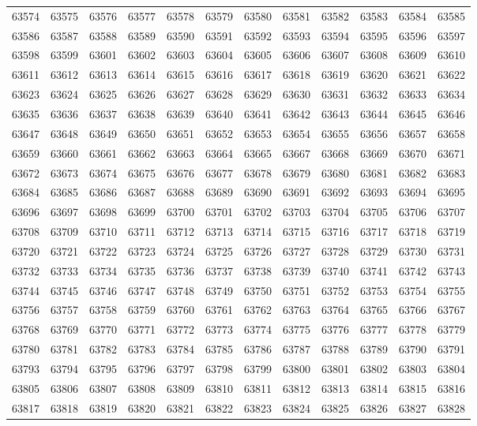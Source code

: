 \begin{center}
\begin{longtable}{llllllllllll}
63574 &63575 &63576 &63577 &63578 &63579 &63580 &63581 &63582 &63583 &63584 &63585 \\
63586 &63587 &63588 &63589 &63590 &63591 &63592 &63593 &63594 &63595 &63596 &63597 \\
63598 &63599 &63601 &63602 &63603 &63604 &63605 &63606 &63607 &63608 &63609 &63610 \\
63611 &63612 &63613 &63614 &63615 &63616 &63617 &63618 &63619 &63620 &63621 &63622 \\
63623 &63624 &63625 &63626 &63627 &63628 &63629 &63630 &63631 &63632 &63633 &63634 \\
63635 &63636 &63637 &63638 &63639 &63640 &63641 &63642 &63643 &63644 &63645 &63646 \\
63647 &63648 &63649 &63650 &63651 &63652 &63653 &63654 &63655 &63656 &63657 &63658 \\
63659 &63660 &63661 &63662 &63663 &63664 &63665 &63667 &63668 &63669 &63670 &63671 \\
63672 &63673 &63674 &63675 &63676 &63677 &63678 &63679 &63680 &63681 &63682 &63683 \\
63684 &63685 &63686 &63687 &63688 &63689 &63690 &63691 &63692 &63693 &63694 &63695 \\
63696 &63697 &63698 &63699 &63700 &63701 &63702 &63703 &63704 &63705 &63706 &63707 \\
63708 &63709 &63710 &63711 &63712 &63713 &63714 &63715 &63716 &63717 &63718 &63719 \\
63720 &63721 &63722 &63723 &63724 &63725 &63726 &63727 &63728 &63729 &63730 &63731 \\
63732 &63733 &63734 &63735 &63736 &63737 &63738 &63739 &63740 &63741 &63742 &63743 \\
63744 &63745 &63746 &63747 &63748 &63749 &63750 &63751 &63752 &63753 &63754 &63755 \\
63756 &63757 &63758 &63759 &63760 &63761 &63762 &63763 &63764 &63765 &63766 &63767 \\
63768 &63769 &63770 &63771 &63772 &63773 &63774 &63775 &63776 &63777 &63778 &63779 \\
63780 &63781 &63782 &63783 &63784 &63785 &63786 &63787 &63788 &63789 &63790 &63791 \\
63793 &63794 &63795 &63796 &63797 &63798 &63799 &63800 &63801 &63802 &63803 &63804 \\
63805 &63806 &63807 &63808 &63809 &63810 &63811 &63812 &63813 &63814 &63815 &63816 \\
63817 &63818 &63819 &63820 &63821 &63822 &63823 &63824 &63825 &63826 &63827 &63828 \\

\end{longtable}
\end{center}
